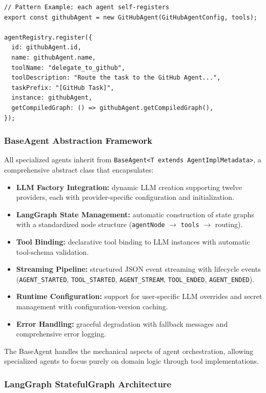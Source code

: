 \documentclass[11pt,a4paper]{report}
\newcommand{\code}[1]{\texttt{\small #1}}
\begin{document}
\begin{lstlisting}[style=tsstyle,caption={Each agent self-registers at module load time.}]
// Pattern Example: each agent self-registers
export const githubAgent = new GitHubAgent(GitHubAgentConfig, tools);

agentRegistry.register({
  id: githubAgent.id,
  name: githubAgent.name,
  toolName: "delegate_to_github",
  toolDescription: "Route the task to the GitHub Agent...",
  taskPrefix: "[GitHub Task]",
  instance: githubAgent,
  getCompiledGraph: () => githubAgent.getCompiledGraph(),
});
\end{lstlisting}

\subsubsection{BaseAgent Abstraction Framework}

All specialized agents inherit from \code{BaseAgent<T extends AgentImplMetadata>},
a comprehensive abstract class that encapsulates:

\begin{itemize}
  \item \textbf{LLM Factory Integration:} dynamic LLM creation supporting twelve providers, each with provider-specific configuration and initialization.
  \item \textbf{LangGraph State Management:} automatic construction of state graphs with a standardized node structure (\code{agentNode} $\rightarrow$ \code{tools} $\rightarrow$ routing).
  \item \textbf{Tool Binding:} declarative tool binding to LLM instances with automatic tool-schema validation.
  \item \textbf{Streaming Pipeline:} structured JSON event streaming with lifecycle events (\code{AGENT\_STARTED}, \code{TOOL\_STARTED}, \code{AGENT\_STREAM}, \code{TOOL\_ENDED}, \code{AGENT\_ENDED}).
  \item \textbf{Runtime Configuration:} support for user-specific LLM overrides and secret management with configuration-version caching.
  \item \textbf{Error Handling:} graceful degradation with fallback messages and comprehensive error logging.
\end{itemize}

The BaseAgent handles the mechanical aspects of agent orchestration, allowing
specialized agents to focus purely on domain logic through tool
implementations.

\subsubsection{LangGraph StatefulGraph Architecture}
\end{document}
